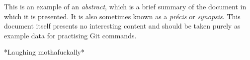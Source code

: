 This is an example of an \emph{abstract}, which is a brief summary of the document in which it is presented.
It is also sometimes known as a \emph{précis} or \emph{synopsis}.
This document itself presents no interesting content and should be taken purely as example data for practising Git commands.

*Laughing mothafuckally*